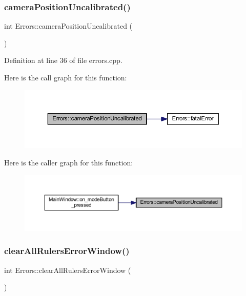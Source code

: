 \subsubsection{\texorpdfstring{cameraPositionUncalibrated()}{cameraPositionUncalibrated()}}
{\footnotesize\ttfamily int Errors\+::camera\+Position\+Uncalibrated (\begin{DoxyParamCaption}{ }\end{DoxyParamCaption})\hspace{0.3cm}{\ttfamily [static]}}



Definition at line 36 of file errors.\+cpp.

Here is the call graph for this function\+:
\nopagebreak
\begin{figure}[H]
\begin{center}
\leavevmode
\includegraphics[width=350pt]{classErrors_a988959b35354c727ebe2fd884ee34bae_cgraph}
\end{center}
\end{figure}
Here is the caller graph for this function\+:
\nopagebreak
\begin{figure}[H]
\begin{center}
\leavevmode
\includegraphics[width=350pt]{classErrors_a988959b35354c727ebe2fd884ee34bae_icgraph}
\end{center}
\end{figure}
\mbox{\label{classErrors_a1aad6f02f491d241fafa37b86dbd0c1a}} 
\subsubsection{\texorpdfstring{clearAllRulersErrorWindow()}{clearAllRulersErrorWindow()}}
{\footnotesize\ttfamily int Errors\+::clear\+All\+Rulers\+Error\+Window (\begin{DoxyParamCaption}{ }\end{DoxyParamCaption})\hspace{0.3cm}{\ttfamily [static]}}



